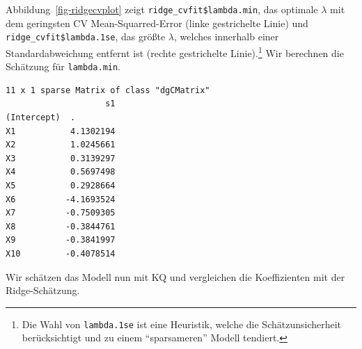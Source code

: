 \documentclass[
  a4paper,
  DIV=11,
  oneside]{scrreprt}
\newenvironment{Shaded}{\begin{snugshade}}{\end{snugshade}}
\newcommand{\AttributeTok}[1]{\textcolor[rgb]{0.40,0.45,0.13}{#1}}
\newcommand{\FunctionTok}[1]{\textcolor[rgb]{0.28,0.35,0.67}{#1}}
\newcommand{\NormalTok}[1]{\textcolor[rgb]{0.00,0.23,0.31}{#1}}
\newcommand{\OtherTok}[1]{\textcolor[rgb]{0.00,0.23,0.31}{#1}}
\newcommand{\SpecialCharTok}[1]{\textcolor[rgb]{0.37,0.37,0.37}{#1}}
\begin{document}
Abbildung~\ref{fig-ridgecvplot} zeigt \texttt{ridge\_cvfit\$lambda.min},
das optimale \(\lambda\) mit dem geringsten CV Mean-Squarred-Error
(linke gestrichelte Linie) und \texttt{ridge\_cvfit\$lambda.1se}, das
größte \(\lambda\), welches innerhalb einer Standardabweichung entfernt
ist (rechte gestrichelte Linie).\footnote{Die Wahl von
  \texttt{lambda.1se} ist eine Heuristik, welche die Schätzunsicherheit
  berücksichtigt und zu einem ``sparsameren'' Modell tendiert.} Wir
berechnen die Schätzung für \texttt{lambda.min}.

\begin{Shaded}
\end{Shaded}

\begin{verbatim}
11 x 1 sparse Matrix of class "dgCMatrix"
                    s1
(Intercept)  .        
X1           4.1302194
X2           1.0245661
X3           0.3139297
X4           0.5697498
X5           0.2928664
X6          -4.1693524
X7          -0.7509305
X8          -0.3844761
X9          -0.3841997
X10         -0.4078514
\end{verbatim}

Wir schätzen das Modell nun mit KQ und vergleichen die Koeffizienten mit
der Ridge-Schätzung.
\end{document}
